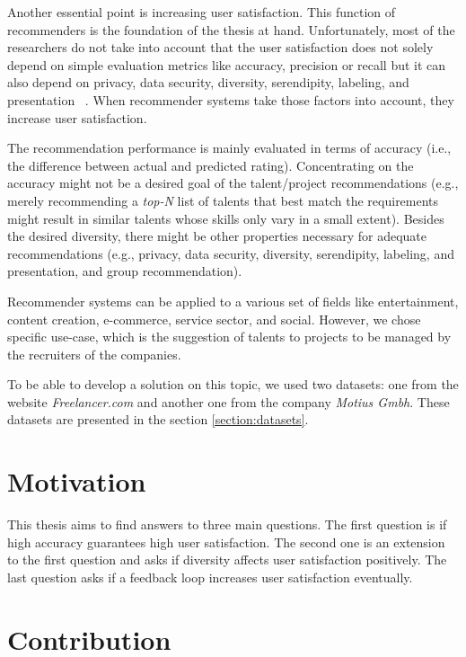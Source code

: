 Another essential point is increasing user satisfaction. This function of recommenders is the foundation of the thesis at hand. Unfortunately, most of the researchers do not take into account that the user satisfaction does not solely depend on simple evaluation metrics like accuracy, precision or recall but it can also depend on privacy, data security, diversity, serendipity, labeling, and presentation ~\parencite{Beel2016}. When recommender systems take those factors into account, they increase user satisfaction.


The recommendation performance is mainly evaluated in terms of accuracy (i.e., the difference between actual and predicted rating). Concentrating on the accuracy might not be a desired goal of the talent/project recommendations (e.g., merely recommending a \textit{top-N} list of talents that best match the requirements might result in similar talents whose skills only vary in a small extent). Besides the desired diversity, there might be other properties necessary for adequate recommendations (e.g., privacy, data security, diversity, serendipity, labeling, and presentation, and group recommendation).


Recommender systems can be applied to a various set of fields like entertainment, content creation, e-commerce, service sector, and social. However, we chose specific use-case, which is the suggestion of talents to projects to be managed by the recruiters of the companies.


To be able to develop a solution on this topic, we used two datasets: one from the website \textit{Freelancer.com} and another one from the company \textit{Motius Gmbh}. These datasets are presented in the section \ref{section:datasets}.


\section{Motivation}\label{section:motivation}

This thesis aims to find answers to three main questions. The first question is if high accuracy guarantees high user satisfaction. The second one is an extension to the first question and asks if diversity affects user satisfaction positively. The last question asks if a feedback loop increases user satisfaction eventually.


\section{Contribution}

